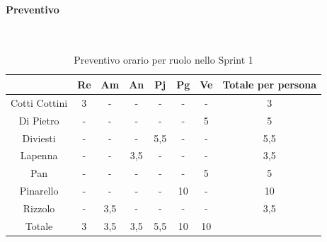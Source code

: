 \documentclass{article}
\begin{document}
                \paragraph{Preventivo}\mbox{}\\
                \begin{table}[H]
                    \centering
                    \begin{tabular}{|c|c|c|c|c|c|c|c|}
                    \hline
                                  & Re  & Am  & An  & Pj  & Pg  & Ve  & Totale per persona \\ \hline
                    Cotti Cottini & 3   & -   & -   & -   & -   & -   & 3                  \\ \hline
                    Di Pietro     & -   & -   & -   & -   & -   & 5   & 5                  \\ \hline
                    Diviesti      & -   & -   & -   & 5,5 & -   & -   & 5,5                \\ \hline
                    Lapenna       & -   & -   & 3,5 & -   & -   & -   & 3,5                \\ \hline
                    Pan           & -   & -   & -   & -   & -   & 5   & 5                  \\ \hline
                    Pinarello     & -   & -   & -   & -   & 10  & -   & 10                 \\ \hline
                    Rizzolo       & -   & 3,5 & -   & -   & -   & -   & 3,5                \\ \hline
                    Totale        & 3   & 3,5 & 3,5 & 5,5 & 10  & 10  &                    \\ \hline
                    \end{tabular}
                    \caption{Preventivo orario per ruolo nello Sprint 1}
                \end{table}

\end{document}

